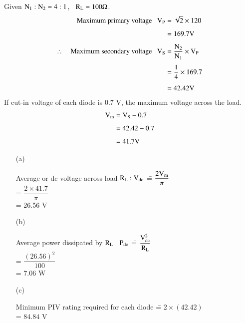 \begin{solution}
Given $\textrm{N}_{1}:\textrm{N}_{2}=4:1$, \ $\textrm{R}_{\textrm{L}}=100\Omega$.
\begin{align*}
\text{Maximum primary voltage~~ } \textrm{V}_{\textrm{P}} &= \sqrt{2}\times 120\\[4pt]
                                             &= 169.7\textrm{V}\\[4pt]
\therefore\quad \text{Maximum secondary voltage~~ } \textrm{V}_{\textrm{S}} &= \frac{\textrm{N}_{2}}{\textrm{N}_{1}}\times \textrm{V}_{\textrm{P}}\\[4pt]
&= \frac{1}{4}\times 169.7\\[4pt]
&= 42.42\textrm{V}
\end{align*}
If cut-in voltage of each diode is 0.7 V, the maximum voltage across the load.
\begin{align*}
\textrm{V}_{\textrm{m}} &= \textrm{V}_{\textrm{S}}-0.7\\[4pt]
          &= 42.42-0.7\\[4pt]
          &= 41.7\textrm{V}
\end{align*}
\begin{itemize}
\item[(a)] 
\begin{tabbing}
Average or dc voltage across load $\textrm{R}_{\textrm{L}}:\textrm{V}_{\text{dc}}$ \== $\dfrac{2\textrm{V}_{\textrm{m}}}{\pi}$\\[7pt]
                                                             \>= $\dfrac{2\times 41.7}{\pi}$\\[7pt]
                                                             \>= 26.56 V
\end{tabbing}

\item[(b)] 
\begin{tabbing}
Average power dissipated by $\textrm{R}_{\textrm{L}}$ \ $\textrm{P}_{\text{dc}}$ \== $\dfrac{\textrm{V}^{2}_{\text{dc}}}{\textrm{R}_{\textrm{L}}}$\\[7pt]
                                                           \>= $\dfrac{(26.56)^{2}}{100}$\\[7pt]
                                                           \>= 7.06 W
\end{tabbing}

\item[(c)] 
\begin{tabbing}
Minimum PIV rating required for each diode \== $2\times (42.42)$\\[3pt]
                                           \>= $84.84$ V
\end{tabbing}
\end{itemize}
\end{solution}

